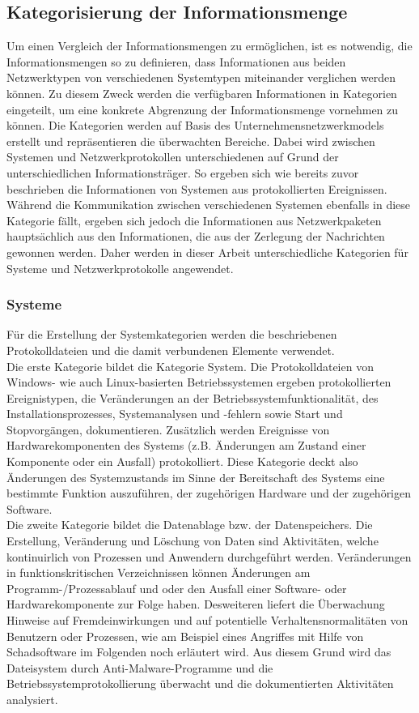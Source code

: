 \subsection{Kategorisierung der Informationsmenge}
Um einen Vergleich der Informationsmengen zu ermöglichen, ist es notwendig, die Informationsmengen so zu definieren, dass Informationen aus beiden Netzwerktypen von verschiedenen Systemtypen miteinander verglichen werden können. Zu diesem Zweck werden die verfügbaren Informationen in Kategorien eingeteilt, um eine konkrete Abgrenzung der Informationsmenge vornehmen zu können. Die Kategorien werden auf Basis des Unternehmensnetzwerkmodels erstellt und repräsentieren die überwachten Bereiche. Dabei wird zwischen Systemen und Netzwerkprotokollen unterschiedenen auf Grund der unterschiedlichen Informationsträger. So ergeben sich wie bereits zuvor beschrieben die Informationen von Systemen aus protokollierten Ereignissen. Während die Kommunikation zwischen verschiedenen Systemen ebenfalls in diese Kategorie fällt, ergeben sich jedoch die Informationen aus Netzwerkpaketen hauptsächlich aus den Informationen, die aus der Zerlegung der Nachrichten gewonnen werden. Daher werden in dieser Arbeit unterschiedliche Kategorien für Systeme und Netzwerkprotokolle angewendet.

\subsubsection{Systeme}
Für die Erstellung der Systemkategorien werden die beschriebenen Protokolldateien und die damit verbundenen Elemente verwendet.  \\

Die erste Kategorie bildet die Kategorie System. 
Die Protokolldateien von Windows- wie auch Linux-basierten Betriebssystemen ergeben protokollierten Ereignistypen, die Veränderungen an der Betriebssystemfunktionalität, des Installationsprozesses, Systemanalysen und -fehlern sowie Start und Stopvorgängen, dokumentieren. Zusätzlich werden Ereignisse von Hardwarekomponenten des Systems (z.B. Änderungen am Zustand einer Komponente oder ein Ausfall) protokolliert. Diese Kategorie deckt also Änderungen des Systemzustands im Sinne der Bereitschaft des Systems eine bestimmte Funktion auszuführen, der zugehörigen Hardware und der zugehörigen Software. \\

Die zweite Kategorie bildet die Datenablage bzw. der Datenspeichers. Die Erstellung, Veränderung und Löschung von Daten sind Aktivitäten, welche kontinuirlich von Prozessen und Anwendern durchgeführt werden. Veränderungen in funktionskritischen Verzeichnissen können Änderungen am Programm-/Prozessablauf und oder den Ausfall einer Software- oder Hardwarekomponente zur Folge haben. Desweiteren liefert die Überwachung Hinweise auf Fremdeinwirkungen und auf potentielle Verhaltensnormalitäten von Benutzern oder Prozessen, wie am Beispiel eines Angriffes mit Hilfe von Schadsoftware im Folgenden noch erläutert wird. Aus diesem Grund wird das Dateisystem durch Anti-Malware-Programme und die Betriebssystemprotokollierung überwacht und die dokumentierten Aktivitäten analysiert. \\

